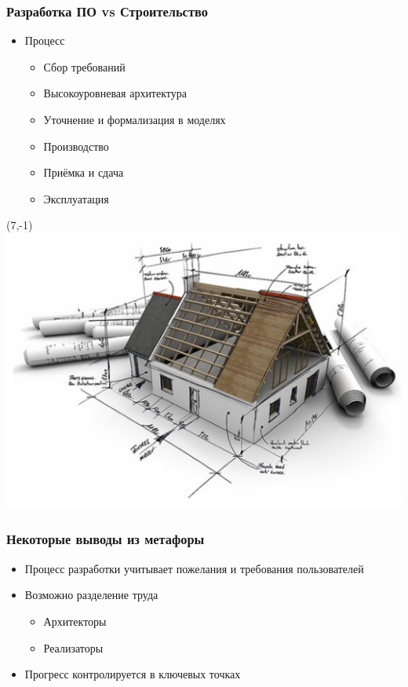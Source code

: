 \documentclass[xetex,mathserif,serif]{beamer}
\begin{document}
	\begin{frame}
		\frametitle{Разработка ПО vs Строительство}
		\begin{itemize}
			\item Процесс
			\begin{itemize}
				\item Сбор требований
				\item Высокоуровневая архитектура
				\item Уточнение и формализация в моделях
				\item Производство
				\item Приёмка и сдача
				\item Эксплуатация
			\end{itemize}
		\end{itemize}
		\begin{textblock}{5}(7,-1)
			\includegraphics[width=\textwidth]{buildingArchitecture.png}
		\end{textblock}
	\end{frame}

	\begin{frame}
		\frametitle{Некоторые выводы из метафоры}
		\begin{itemize}
			\item Процесс разработки учитывает пожелания и требования пользователей
			\item Возможно разделение труда
			\begin{itemize}
				\item Архитекторы
				\item Реализаторы
			\end{itemize}
			\item Прогресс контролируется в ключевых точках
		\end{itemize}
	\end{frame}
\end{document}
